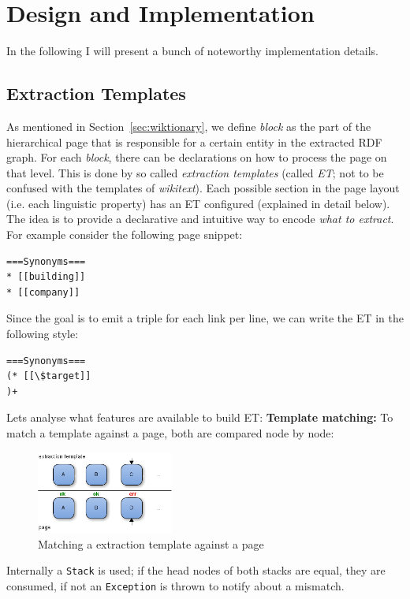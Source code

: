 \section{Design and Implementation}
\label{sec:implementation}
In the following I will present a bunch of noteworthy implementation details.

\subsection{Extraction Templates}\label{sec:extpl}
As mentioned in Section~\ref{sec:wiktionary}, we define \textit{block} as the part of the hierarchical page that is responsible for a certain entity in the extracted RDF graph. 
For each \textit{block}, there can be declarations on how to process the page on that level.
This is done by so called \textit{extraction templates} (called \textit{ET}; not to be confused with the templates of \textit{wikitext}).
Each possible section in the \wik page layout (i.e. each linguistic property) has an ET configured (explained in detail below). 
The idea is to provide a declarative and intuitive way to encode \textit{what to extract}.
For example consider the following page snippet:
\begin{lstlisting}
===Synonyms===
* [[building]]
* [[company]]
\end{lstlisting}
Since the goal is to emit a triple for each link per line, we can write the ET in the following style:
\begin{lstlisting}
===Synonyms===
(* [[\$target]]
)+
\end{lstlisting}
Lets analyse what features are available to build ET:\newline
\textbf{Template matching:}
To match a template against a page, both are compared node by node:
\begin{figure}[h]
\centering
\includegraphics[width=0.4\textwidth]{../images/matching}
\caption{Matching a extraction template against a page}
\label{fig:matching}
\end{figure}
Internally a \texttt{Stack} is used; if the head nodes of both stacks are equal, they are consumed, if not an \texttt{Exception} is thrown to notify about a mismatch.\newline
